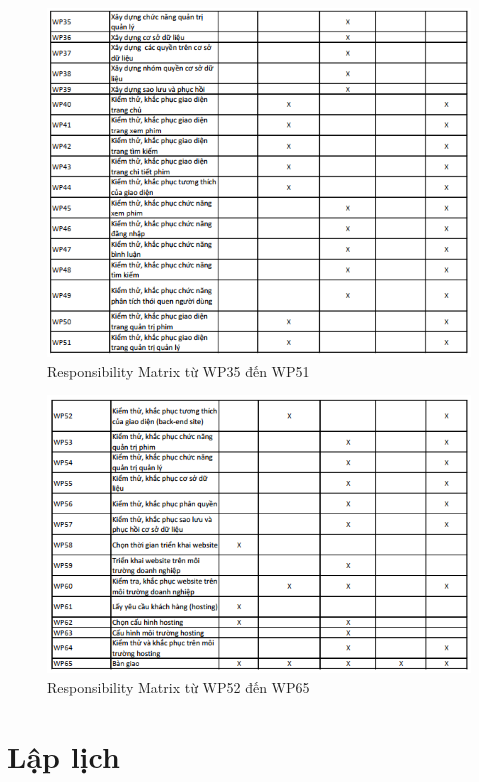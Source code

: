 \documentclass[a4paper]{book}
\begin{document}
\begin{figure}
	\centering
	\includegraphics[width=0.7\textheight]{RM_35_51.png}
	\caption{Responsibility Matrix từ WP35 đến WP51}
	\label{fig:RM_35_51}
\end{figure}
\begin{figure}
	\centering
	\includegraphics[width=0.7\textheight]{RM_52_65.png}
	\caption{Responsibility Matrix từ WP52 đến WP65}
	\label{fig:RM_52_65}
\end{figure}
\chapter{Lập lịch}
\end{document}
